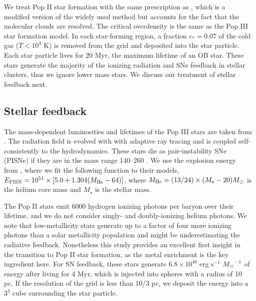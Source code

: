 \documentclass[apjl]{emulateapj}
\begin{document}
%

We treat Pop II star formation with the same prescription as
\citet{Wise09}, which is a modified version of the widely used
\citet{Cen92} method but accounts for the fact that the molecular
clouds are resolved.  The critical overdensity is the same as the Pop
III star formation model.  In each star-forming region, a fraction
$c_* = 0.07$ of the cold gas ($T < 10^3$ K) is removed from the grid
and deposited into the star particle.  Each star particle lives for 20
Myr, the maximum lifetime of an OB star.  These stars generate the
majority of the ionizing radiation and SNe feedback in stellar
clusters, thus we ignore lower mass stars.  We discuss our treatment
of stellar feedback next.

\subsection{Stellar feedback}

The mass-dependent luminosities and lifetimes of the Pop III stars are
taken from \citet{Schaerer02}.  The radiation field is evolved with
with adaptive ray tracing \citep{Abel02, Wise10} and is coupled
self-consistently to the hydrodynamics.  These stars die as
pair-instability SNe (PISNe) if they are in the mass range 140--260
\Ms \citep{Heger02}.  We use the explosion energy from
\citeauthor{Heger02}, where we fit the following function to their
models, $E_{\rm PISN} = 10^{51} \times [5.0 + 1.304 (M_{\rm He} -
64)]$, where $M_{\rm He} = (13/24) \times (M_\star - 20) \Ms$ is the
helium core mass and $M_\star$ is the stellar mass.

The Pop II stars emit 6000 hydrogen ionizing photons per baryon over
their lifetime, and we do not consider singly- and doubly-ionizing
helium photons.  We note that low-metallicity stars generate up to a
factor of four more ionizing photons than a solar metallicity
population \citep{Schaerer03} and might be underestimating the
radiative feedback.  Nonetheless this study provides an excellent
first insight in the transition to Pop II star formation, as the metal
enrichment is the key ingredient here.  For SN feedback, these stars
generate $6.8 \times 10^{48}$ erg s$^{-1}$ $\Ms^{-1}$ of energy after
living for 4 Myr, which is injected into spheres with a radius of 10
pc.  If the resolution of the grid is less than 10/3 pc, we deposit
the energy into a $3^3$ cube surrounding the star particle.
\end{document}
